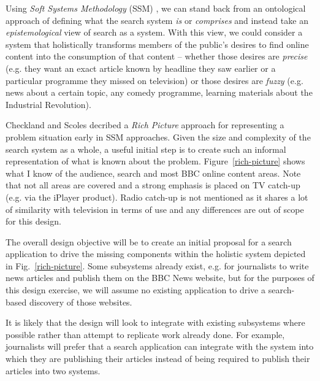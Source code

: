 \documentclass[oribibl]{llncs}
\begin{document}
Using \emph{Soft Systems Methodology} (SSM)
\citep{checkland2006learning}, we can stand back from
an ontological approach of defining what the search system \emph{is} or
\emph{comprises} and instead take an \emph{epistemological} view of search
as a system. With this view, we could consider a system that holistically
transforms members of the public's desires to find online content into
the consumption of that content -- whether those desires are \emph{precise}
(e.g. they want an exact article known by headline they saw earlier or a
particular programme they missed on television) or those desires are
\emph{fuzzy} (e.g. news about a certain topic, any comedy programme, learning
materials about the Industrial Revolution).

Checkland and Scoles \citep{checkland1990soft} decribed a \emph{Rich Picture} approach
for representing a problem situation early in SSM approaches.
Given the size and complexity of the
search system as a whole, a useful initial step is to create such an informal
representation of what is known about the problem. Figure~\ref{rich-picture}
shows what I know of the audience, search and most BBC online content areas.
Note that not all areas are covered and a strong emphasis is placed on TV
catch-up (e.g. via the iPlayer product). Radio catch-up is not mentioned
as it shares a lot of similarity with television in terms of use and any
differences are out of scope for this design.

The overall design objective will be to create an initial proposal for a
search application to drive the missing components within the holistic
system depicted in Fig.~\ref{rich-picture}. Some subsystems already
exist, e.g. for journalists to write news articles and publish them on the
BBC News website, but for the purposes of this design exercise, we will
assume no existing application to drive a search-based discovery of
those websites.

It is likely that the design will look to integrate with
existing subsystems where possible rather than attempt to replicate
work already done. For example, journalists will prefer that a search
application can integrate with the system into which they are publishing
their articles instead of being required to publish their articles into
two systems.
\end{document}
